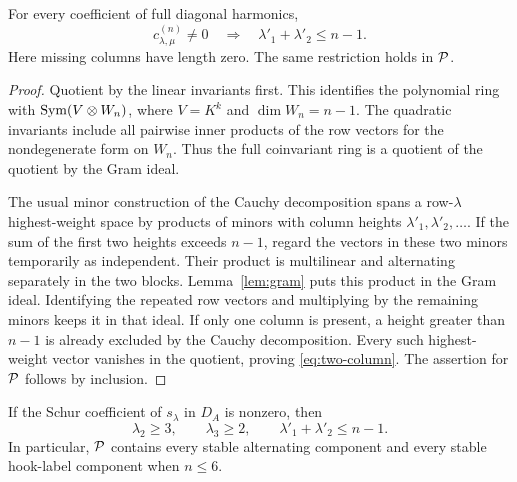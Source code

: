 \begin{theorem}\label{thm:two-column}
For every coefficient of full diagonal harmonics,
\begin{equation}\label{eq:two-column}
 c_{\lambda,\mu}^{(n)}\ne0
       \quad\Longrightarrow\quad
       \lambda'_1+\lambda'_2\leq n-1.
\end{equation}
Here missing columns have length zero.
The same restriction holds in $\mathcal P$.
\end{theorem}

\begin{proof}
Quotient by the linear invariants first.  This
identifies the polynomial ring with
$\operatorname{Sym}(V\otimes W_n)$, where $V=K^k$ and
$\dim W_n=n-1$.
The quadratic invariants include all pairwise
inner products of the row vectors for the
nondegenerate form on $W_n$.
Thus the full coinvariant ring is a quotient of
the quotient by the Gram ideal.

The usual minor construction of the Cauchy
decomposition spans a row-$\lambda$ highest-weight
space by products of minors with column heights
$\lambda'_1,\lambda'_2,\ldots$.
If the sum of the first two heights exceeds
$n-1$, regard the vectors in these two minors
temporarily as independent.  Their product is
multilinear and alternating separately in the
two blocks.  Lemma~\ref{lem:gram} puts this product
in the Gram ideal.  Identifying the repeated
row vectors and multiplying by the remaining
minors keeps it in that ideal.
If only one column is present, a height greater
than $n-1$ is already excluded by the Cauchy
decomposition.
Every such highest-weight vector vanishes in
the quotient, proving \eqref{eq:two-column}.
The assertion for $\mathcal P$ follows by inclusion.
\end{proof}

\begin{corollary}
\label{cor:r2-defect-support}
If the Schur coefficient of $s_\lambda$ in $D_A$ is nonzero, then
\begin{equation}\label{eq:r2-defect-support}
 \lambda_2\geq3,\qquad \lambda_3\geq2,\qquad
                 \lambda'_1+\lambda'_2\leq n-1.
\end{equation}
In particular, $\mathcal P$ contains every stable alternating component and
every stable hook-label component when $n\leq6$.
\end{corollary}

